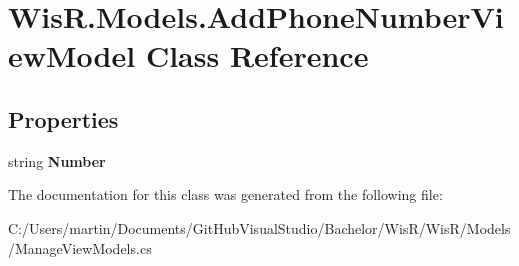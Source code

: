 \hypertarget{class_wis_r_1_1_models_1_1_add_phone_number_view_model}{}\section{Wis\+R.\+Models.\+Add\+Phone\+Number\+View\+Model Class Reference}
\label{class_wis_r_1_1_models_1_1_add_phone_number_view_model}
\subsection*{Properties}
\begin{DoxyCompactItemize}
\item 
\hypertarget{class_wis_r_1_1_models_1_1_add_phone_number_view_model_a05a6c858625383abc21ad991912e4a58}{}string {\bfseries Number}\label{class_wis_r_1_1_models_1_1_add_phone_number_view_model_a05a6c858625383abc21ad991912e4a58}

\end{DoxyCompactItemize}


The documentation for this class was generated from the following file\+:\begin{DoxyCompactItemize}
\item 
C\+:/\+Users/martin/\+Documents/\+Git\+Hub\+Visual\+Studio/\+Bachelor/\+Wis\+R/\+Wis\+R/\+Models/Manage\+View\+Models.\+cs\end{DoxyCompactItemize}
